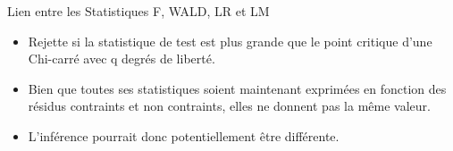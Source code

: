 \documentclass{beamer}
\begin{document}
\begin{frame}{Lien entre les Statistiques F, WALD, LR et LM}
\begin{itemize}
\item Rejette si la statistique de test est plus grande que le point critique d’une Chi-carré avec q degrés de liberté.
\item Bien que toutes ses statistiques soient maintenant exprimées en fonction des résidus contraints et non contraints, elles ne donnent pas la même valeur. 
\item L’inférence pourrait donc potentiellement être différente.
\end{itemize}

\end{frame}
\end{document}
